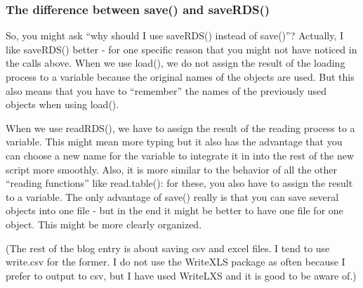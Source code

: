 \documentclass[
]{article}
\begin{document}
\hypertarget{the-difference-between-save-and-saverds}{%
\subsubsection{The difference between save() and
saveRDS()}\label{the-difference-between-save-and-saverds}}

So, you might ask ``why should I use saveRDS() instead of save()''?
Actually, I like saveRDS() better - for one specific reason that you
might not have noticed in the calls above. When we use load(), we do not
assign the result of the loading process to a variable because the
original names of the objects are used. But this also means that you
have to ``remember'' the names of the previously used objects when using
load().

When we use readRDS(), we have to assign the result of the reading
process to a variable. This might mean more typing but it also has the
advantage that you can choose a new name for the variable to integrate
it in into the rest of the new script more smoothly. Also, it is more
similar to the behavior of all the other ``reading functions'' like
read.table(): for these, you also have to assign the result to a
variable. The only advantage of save() really is that you can save
several objects into one file - but in the end it might be better to
have one file for one object. This might be more clearly organized.

(The rest of the blog entry is about saving csv and excel files. I tend
to use write.csv for the former. I do not use the WriteXLS package as
often because I prefer to output to csv, but I have used WriteLXS and it
is good to be aware of.)
\end{document}
